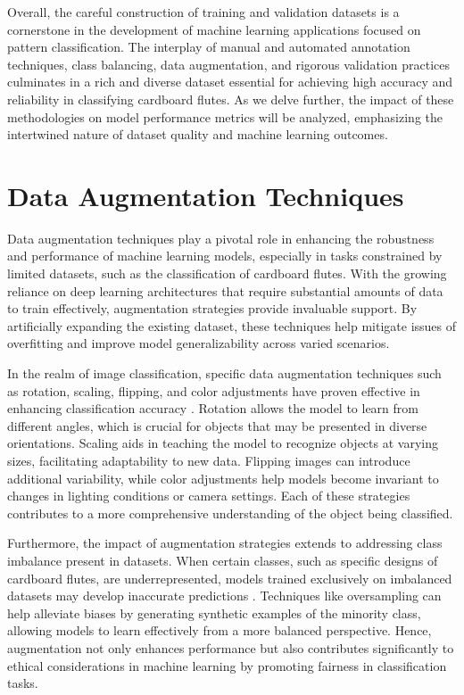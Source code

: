 Overall, the careful construction of training and validation datasets is a cornerstone in the development of machine learning applications focused on pattern classification. The interplay of manual and automated annotation techniques, class balancing, data augmentation, and rigorous validation practices culminates in a rich and diverse dataset essential for achieving high accuracy and reliability in classifying cardboard flutes. As we delve further, the impact of these methodologies on model performance metrics will be analyzed, emphasizing the intertwined nature of dataset quality and machine learning outcomes.

\section{Data Augmentation Techniques}

Data augmentation techniques play a pivotal role in enhancing the robustness and performance of machine learning models, especially in tasks constrained by limited datasets, such as the classification of cardboard flutes. With the growing reliance on deep learning architectures that require substantial amounts of data to train effectively, augmentation strategies provide invaluable support. By artificially expanding the existing dataset, these techniques help mitigate issues of overfitting and improve model generalizability across varied scenarios.


In the realm of image classification, specific data augmentation techniques such as rotation, scaling, flipping, and color adjustments have proven effective in enhancing classification accuracy \cite{taylor2018augmentation}. Rotation allows the model to learn from different angles, which is crucial for objects that may be presented in diverse orientations. Scaling aids in teaching the model to recognize objects at varying sizes, facilitating adaptability to new data. Flipping images can introduce additional variability, while color adjustments help models become invariant to changes in lighting conditions or camera settings. Each of these strategies contributes to a more comprehensive understanding of the object being classified.


Furthermore, the impact of augmentation strategies extends to addressing class imbalance present in datasets. When certain classes, such as specific designs of cardboard flutes, are underrepresented, models trained exclusively on imbalanced datasets may develop inaccurate predictions \cite{buda2018systematic}. Techniques like oversampling can help alleviate biases by generating synthetic examples of the minority class, allowing models to learn effectively from a more balanced perspective. Hence, augmentation not only enhances performance but also contributes significantly to ethical considerations in machine learning by promoting fairness in classification tasks.


